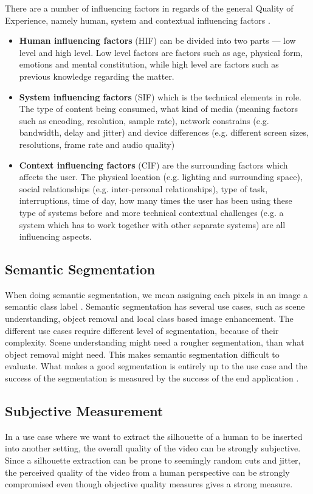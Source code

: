There are a number of influencing factors in regards of the general Quality of Experience, namely human, system and contextual influencing factors \cite{factors_QoE}.
\begin{itemize}
    \item \textbf{Human influencing factors} (HIF) can be divided into two parts — low level and high level. Low level factors are factors such as age, physical form, emotions and mental constitution, while high level are factors such as previous knowledge regarding the matter. 
    \item \textbf{System influencing factors} (SIF) which is the technical elements in role. The type of content being consumed, what kind of media (meaning factors such as encoding, resolution, sample rate), network constrains (e.g. bandwidth, delay and jitter) and device differences (e.g. different screen sizes, resolutions, frame rate and audio quality)
    \item \textbf{Context influencing factors} (CIF) are the surrounding factors which affects the user. The physical location (e.g. lighting and surrounding space), social relationships (e.g. inter-personal relationships), type of task, interruptions, time of day, how many times the user has been using these type of systems before and more technical contextual challenges (e.g. a system which has to work together with other separate systems) are all influencing aspects.
\end{itemize}


\subsection{Semantic Segmentation}
When doing semantic segmentation, we mean assigning each pixels in an image a semantic class label \cite{csurka2013good}. Semantic segmentation has several use cases, such as scene understanding, object removal and local class based image enhancement. The different use cases require different level of segmentation, because of their complexity. Scene understanding might need a rougher segmentation, than what object removal might need. This makes semantic segmentation difficult to evaluate. What makes a good segmentation is entirely up to the use case and the success of the segmentation is measured by the success of the end application \cite{csurka2013good}.


\subsection{Subjective Measurement}
\label{sec:measurement}
In a use case where we want to extract the silhouette of a human to be inserted into another setting, the overall quality of the video can be strongly subjective. Since a silhouette extraction can be prone to seemingly random cuts and jitter, the perceived quality of the video from a human perspective can be strongly compromised even though objective quality measures gives a strong measure. 

